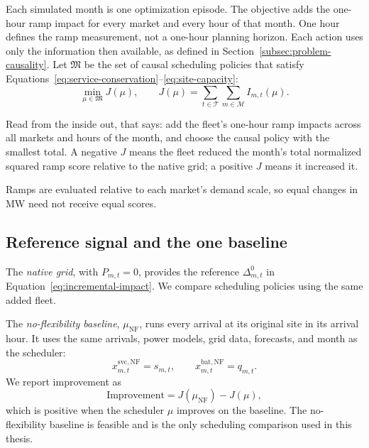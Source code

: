 \documentclass[conference]{IEEEtran}
\begin{document}
Each simulated month is one optimization episode. The objective adds the
one-hour ramp impact for every market and every hour of that month.
One hour defines the ramp measurement, not a one-hour
planning horizon. Each action uses only the information then available, as
defined in Section~\ref{subsec:problem-causality}. Let \(\mathfrak M\) be the
set of causal scheduling policies that satisfy
Equations~\eqref{eq:service-conservation}--\eqref{eq:site-capacity}:
\begin{equation}
  \min_{\mu\in\mathfrak M} J(\mu),
  \qquad
  J(\mu)
  =
  \sum_{t\in\mathcal T}
  \sum_{m\in\mathcal M}
  I_{m,t}(\mu).
  \label{eq:objective}
\end{equation}

Read from the inside out, that says: add the fleet's one-hour ramp impacts
across all markets and hours of the month,
and choose the causal policy with the smallest total. A negative \(J\)
means the fleet reduced the month's total normalized squared ramp score
relative to the native grid; a positive \(J\) means it increased it.

Ramps are evaluated relative to each market's demand scale, so equal
changes in MW need not receive equal scores.

\subsection{Reference signal and the one baseline}
\label{subsec:problem-baselines}

The \emph{native grid}, with \(P_{m,t}=0\), provides the reference
\(\Delta^0_{m,t}\) in Equation~\eqref{eq:incremental-impact}. We compare
scheduling policies using the same added fleet.

The \emph{no-flexibility baseline}, \(\mu_{\mathrm{NF}}\), runs every arrival
at its original site in its arrival hour. It uses the same arrivals, power
models, grid data, forecasts, and month as the scheduler:
\begin{equation}
  x^{\mathrm{svc},\mathrm{NF}}_{m,t}=s_{m,t},
  \qquad
  x^{\mathrm{bat},\mathrm{NF}}_{m,t}=q_{m,t}.
  \label{eq:no-flex-baseline}
\end{equation}
We report improvement as
\begin{equation}
  \text{Improvement}
  =
  J(\mu_{\mathrm{NF}})-J(\mu),
  \label{eq:improvement}
\end{equation}
which is positive when the scheduler \(\mu\) improves on the baseline.
The no-flexibility baseline is feasible and is the only scheduling
comparison used in this thesis.
\end{document}
